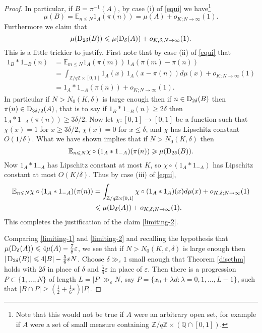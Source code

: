 \documentclass[10pt,reqno]{amsart}
\theoremstyle{definition}
\theoremstyle{remark}
\renewcommand{\leq}{\leqslant}
\renewcommand{\geq}{\geqslant}
\def\Z{\mathbb{Z}}
\def\E{\mathbb{E}}
\def\Q{\mathbb{Q}}
\def\eps{\varepsilon}
\numberwithin{equation}{section}
\begin{document}
\begin{proof}
In particular, if $B = \pi^{-1}(A)$, by case (i) of \eqref{equi} we have\footnote{Note that this would not be true if $A$ were an arbitrary open set, for example if $A$ were a set of small measure containing $\Z/q\Z \times (\Q \cap [0,1])$.}
\begin{equation}\label{limiting-1} \mu(B) = \E_{n \leq N} 1_A(\pi(n)) =  \mu(A) + o_{K; N \rightarrow \infty}(1).\end{equation} 
Furthermore we claim that
\begin{equation}\label{limiting-2}  \mu(\Sym_{2\delta}(B)) \leq \mu(\Sym_{\delta}(A)) + o_{K,\delta; N \rightarrow \infty}(1).\end{equation}  This is a little trickier to justify. First note that by case (ii) of \eqref{equi} that
\begin{align*}
1_B \ast 1_{-B}(n) & = \E_{m \leq N} 1_A (\pi(m))\, 1_A(\pi(m) - \pi(n)) \\ & = \int_{\Z/q\Z \times [0,1]} 1_A (x)\, 1_A (x - \pi(n))d\mu(x) + o_{K; N \rightarrow \infty}(1) \\ & = 1_A \ast 1_{-A} (\pi(n)) + o_{K; N \rightarrow \infty}(1).
\end{align*}
In particular if $N > N_0(K,\delta)$ is large enough then if $n \in \operatorname{D}_{2\delta}(B)$ then $\pi(n) \in \operatorname{D}_{3\delta/2}(A)$, that is to say if $1_B \ast 1_{-B}(n) \geq 2\delta$ then $1_A \ast 1_{-A}(\pi(n)) \geq 3\delta/2$. Now let $\chi : [0,1] \rightarrow [0,1]$ be a function such that $\chi(x) = 1$ for $x  \geq 3\delta/2$, $\chi(x) = 0$ for $x \leq \delta$, and $\chi$ has Lipschitz constant $O(1/\delta)$. What we have shown implies that if $N > N_0(K,\delta)$ then
\[ \E_{n \leq N} \chi \circ (1_A \ast 1_{-A})(\pi(n)) \geq \mu(\Sym_{2\delta}(B)) .\]
Now $1_A \ast 1_{-A}$ has Lipschitz constant at most $K$, so $\chi \circ (1_A \ast 1_{-A})$ has Lipschitz constant at most $O(K/\delta)$. Thus by case (iii) of \eqref{equi},
\begin{align*} \E_{n \leq N} \chi \circ (1_A \ast 1_{-A})(\pi(n)) & = \int_{\Z/q\Z \times [0,1]} \chi \circ (1_A \ast 1_A)(x) d\mu(x) + o_{K,\delta; N \rightarrow \infty}(1)\\ & \leq \mu (\Sym_{\delta}(A)) + o_{K,\delta; N \rightarrow \infty}(1).\end{align*} This completes the justification of the claim \eqref{limiting-2}. 

Comparing \eqref{limiting-1} and \eqref{limiting-2} and recalling the hypothesis that $\mu(\Sym_{\delta}(A)) \leq 4 \mu(A) - \frac{7}{8}\eps$, we see that if $N >N_0(K,\eps,\delta)$ is large enough then $|\Sym_{2\delta}(B)| \leq 4|B| - \frac{5}{6}\eps N$.  Choose $\delta \gg_\eps 1$ small enough that Theorem \ref{discthm} holds with $2\delta$ in place of $\delta$ and $\frac{5}{6}\eps$ in place of $\eps$. Then there is a progression $P \subset \{1,\dots,N\}$ of length $L=|P|\gg_{\eps} N$, say $P = \{x_0 + \lambda d : \lambda = 0,1,\dots, L-1\}$, such that $|B \cap P| \geq (\frac{1}{2} + \tfrac{1}{6}\eps)|P|$. 



\end{proof}
\end{document}
